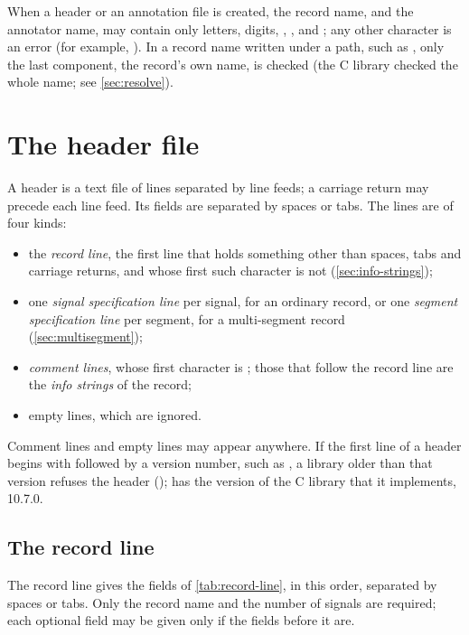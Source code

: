 When a header or an annotation file is created, the record name, and the
annotator name, may contain only letters, digits, \code{\_}, \code{-},
\code{\textasciitilde} and \code{/}; any other character is an error (for
example, ). In a record name
written under a path, such as , only the last component, the
record's own name, is checked (the C library checked the whole name; see
\cref{sec:resolve}).

\section{The header file}
\label{sec:header}

A header is a text file of lines separated by line feeds; a carriage return
may precede each line feed. Its fields are separated by spaces or tabs. The
lines are of four kinds:
\begin{itemize}
\item the \emph{record line}, the first line that holds something other
  than spaces, tabs and carriage returns, and whose first such character is
  not \code{\#} (\cref{sec:info-strings});
\item one \emph{signal specification line} per signal, for an ordinary
  record, or one \emph{segment specification line} per segment, for a
  multi-segment record (\cref{sec:multisegment});
\item \emph{comment lines}, whose first character is \code{\#}; those that
  follow the record line are the \emph{info strings} of the record;
\item empty lines, which are ignored.
\end{itemize}
Comment lines and empty lines may appear anywhere. If the first line of a
header begins with  followed by a version number, such as
, a library older than that version refuses the header
(); \wfdbx{} has the version of the C library that it implements,
10.7.0.

\subsection{The record line}

The record line gives the fields of \cref{tab:record-line}, in this order,
separated by spaces or tabs. Only the record name and the number of signals
are required; each optional field may be given only if the fields before it
are.

